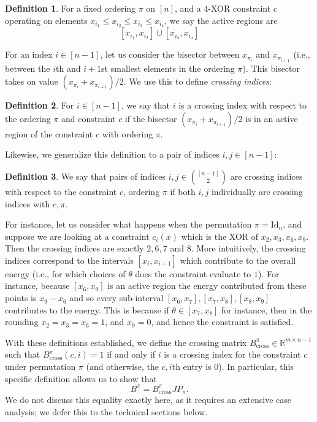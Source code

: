 \documentclass[11pt]{article}
\theoremstyle{definition}
\newtheorem{definition}{Definition}[section]
\newcommand{\R}{\mathbb{R}}
\begin{document}
\begin{definition}
	For a fixed ordering $\pi$ on $[n]$, and a 4-XOR constraint $c$ operating on elements $x_{i_1} \leq x_{i_2} \leq x_{i_3} \leq x_{i_4}$, we say the active regions are 
	\[
	[x_{i_1}, x_{i_2}] \cup [x_{i_3}, x_{i_4}]
	\]
\end{definition}

For an index $i \in [n-1]$, let us consider the bisector between $x_{\pi_i}$ and $x_{\pi_{i+1}}$ (i.e., between the $i$th and $i+1$st smallest elements in the ordering $\pi$). This bisector takes on value $(x_{\pi_i} + x_{\pi_{i+1}}) / 2$. We use this to define \emph{crossing indices}:

\begin{definition}
	For $i \in [n-1]$, we say that $i$ is a crossing index with respect to the ordering $\pi$ and constraint $c$ if the bisector $(x_{\pi_i} + x_{\pi_{i+1}}) / 2$ is in an active region of the constraint $c$ with ordering $\pi$.
\end{definition}

Likewise, we generalize this definition to a pair of indices $i,j \in [n-1]$:

\begin{definition}
	We say that pairs of indices $i,j \in \binom{[n-1]}{2}$ are crossing indices with respect to the constraint $c$, ordering $\pi$ if both $i, j$ individually are crossing indices with $c, \pi$.
\end{definition}

For instance, let us consider what happens when the permutation $\pi = \mathrm{Id}_n$, and suppose we are looking at a constraint $c_i(x)$ which is the XOR of $x_{2}, x_{3}, x_{6}, x_{9}$. Then the crossing indices are exactly $2, 6, 7$ and $8$. More intuitively, the crossing indices correspond to the intervals $[x_{i}, x_{i+1}]$ which contribute to the overall energy (i.e., for which choices of $\theta$ does the constraint evaluate to $1$). For instance, because $[x_6, x_9]$ is an active region the energy contributed from these points is $x_9 - x_6$ and so every sub-interval $[x_6, x_7], [x_7, x_8], [x_8, x_9]$ contributes to the energy. This is because if $\theta \in [x_7, x_8]$ for instance, then in the rounding $x_2 = x_3 = x_6 = 1$, and $x_9 = 0$, and hence the constraint is satisfied. 

With these definitions established, we define the crossing matrix $B_{\mathrm{cross}}^{\pi} \in \R^{m \times n-1}$ such that $B_{\mathrm{cross}}^{\pi}(c, i) = 1$ if and only if $i$ is a crossing index for the constraint $c$ under permutation $\pi$ (and otherwise, the $c, i$th entry is $0$). In particular, this specific definition allows us to show that
\[
B^{\pi} = B_{\mathrm{cross}}^{\pi} J P_{\pi}.
\]
We do not discuss this equality exactly here, as it requires an extensive case analysis; we defer this to the technical sections below. 
\end{document}
